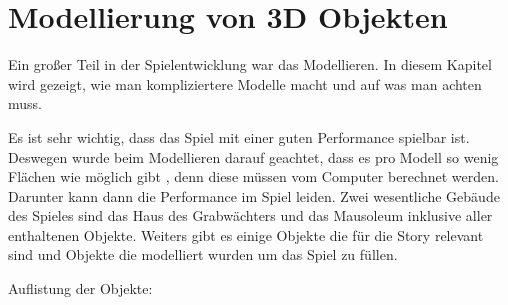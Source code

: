 \section{Modellierung von 3D Objekten}
\label{sec:Modellierung_von_3D_Objekten}
Ein großer Teil in der Spielentwicklung war das Modellieren. In diesem Kapitel wird gezeigt, wie man kompliziertere
Modelle macht und auf was man achten muss.

Es ist sehr wichtig, dass das Spiel mit einer guten Performance spielbar ist. Deswegen wurde beim Modellieren darauf geachtet,
dass es pro Modell so wenig Flächen wie möglich gibt \citep{unreal:modellierungVon3dObjekten_performance}, denn diese müssen vom Computer berechnet werden.
Darunter kann dann die Performance im Spiel leiden.
Zwei wesentliche Gebäude des Spieles sind das Haus des Grabwächters und das Mausoleum inklusive aller enthaltenen Objekte.
Weiters gibt es einige Objekte die für die Story relevant sind und Objekte die modelliert wurden um das Spiel zu füllen.

Auflistung der Objekte:


